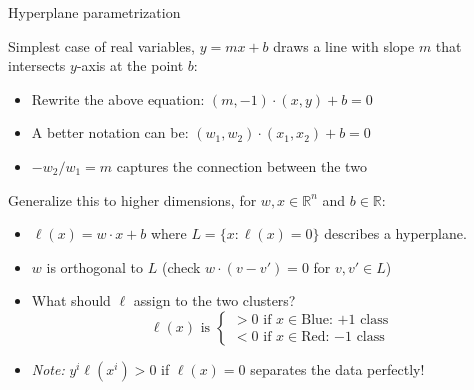 \documentclass{beamer}
\begin{document}
\begin{frame}{Hyperplane parametrization}

Simplest case of real variables, $y = mx + b$ draws a line with slope $m$ that intersects $y$-axis at the point $b$:

\begin{itemize}
    \item Rewrite the above equation: $(m, -1) \cdot (x, y) + b = 0$
    \item A better notation can be: $(w_1, w_2) \cdot (x_1, x_2) + b = 0$ \item $-w_2/w_1 = m$ captures the connection between the two
\end{itemize}
\pause
Generalize this to higher dimensions, for $w, x \in \mathbb{R}^n$ and $b \in \mathbb{R}$:
\begin{itemize}
    \item $ \ell(x) = w\cdot x + b$ where $L=\{x:\ell(x) = 0\}$ describes a hyperplane.
    \item $w$ is orthogonal to $L$ (check $w\cdot (v-v') = 0$ for $v,v'\in L$)
    \item What should $\ell$ assign to the two clusters?
        \[
        \ell(x) \text{ is }
        \begin{cases}
        > 0 \text{ if } x \in \text{Blue: $+1$ class} \\
        < 0 \text{ if } x \in \text{Red: $-1$ class}
        \end{cases}
        \]
    \item \textit{Note:} $y^i\ell(x^i) > 0$ if $\ell(x)=0$ separates the data perfectly!
\end{itemize}

\end{frame}

\end{document}
